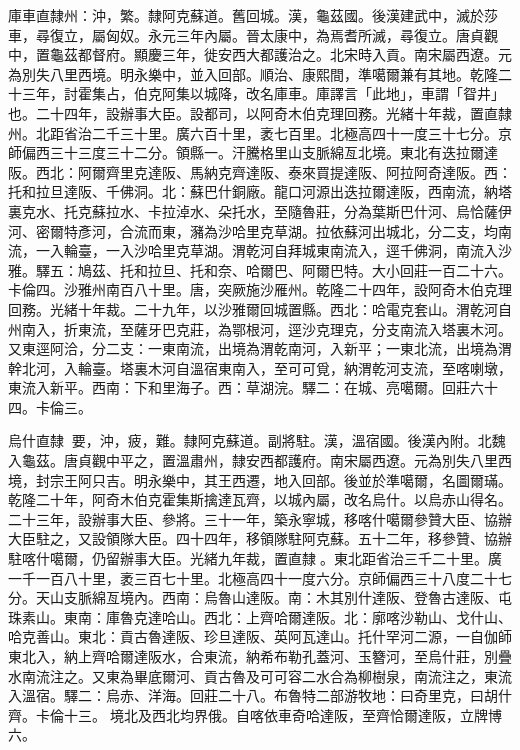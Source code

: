 \begin{pinyinscope}
庫車直隸州：沖，繁。隸阿克蘇道。舊回城。漢，龜茲國。後漢建武中，滅於莎車，尋復立，屬匈奴。永元三年內屬。晉太康中，為焉耆所滅，尋復立。唐貞觀中，置龜茲都督府。顯慶三年，徙安西大都護治之。北宋時入貢。南宋屬西遼。元為別失八里西境。明永樂中，並入回部。順治、康熙間，準噶爾兼有其地。乾隆二十三年，討霍集占，伯克阿集以城降，改名庫車。庫譯言「此地」，車謂「眢井」也。二十四年，設辦事大臣。設都司，以阿奇木伯克理回務。光緒十年裁，置直隸州。北距省治二千三十里。廣六百十里，袤七百里。北極高四十一度三十七分。京師偏西三十三度三十二分。領縣一。汗騰格里山支脈綿亙北境。東北有迭拉爾達阪。西北：阿爾齊里克達阪、馬納克齊達阪、泰來買提達阪、阿拉阿奇達阪。西：托和拉旦達阪、千佛洞。北：蘇巴什銅廠。龍口河源出迭拉爾達阪，西南流，納塔裏克水、托克蘇拉水、卡拉淖水、朵托水，至隨魯莊，分為葉斯巴什河、烏恰薩伊河、密爾特彥河，合流而東，瀦為沙哈里克草湖。拉依蘇河出城北，分二支，均南流，一入輪臺，一入沙哈里克草湖。渭乾河自拜城東南流入，逕千佛洞，南流入沙雅。驛五：鳩茲、托和拉旦、托和奈、哈爾巴、阿爾巴特。大小回莊一百二十六。卡倫四。沙雅州南百八十里。唐，突厥施沙雁州。乾隆二十四年，設阿奇木伯克理回務。光緒十年裁。二十九年，以沙雅爾回城置縣。西北：哈電克套山。渭乾河自州南入，折東流，至薩牙巴克莊，為鄂根河，逕沙克理克，分支南流入塔裏木河。又東逕阿洽，分二支：一東南流，出境為渭乾南河，入新平；一東北流，出境為渭幹北河，入輪臺。塔裏木河自溫宿東南入，至可可覓，納渭乾河支流，至喀喇墩，東流入新平。西南：下和里海子。西：草湖浣。驛二：在城、亮噶爾。回莊六十四。卡倫三。

烏什直隸：要，沖，疲，難。隸阿克蘇道。副將駐。漢，溫宿國。後漢內附。北魏入龜茲。唐貞觀中平之，置溫肅州，隸安西都護府。南宋屬西遼。元為別失八里西境，封宗王阿只吉。明永樂中，其王西遷，地入回部。後並於準噶爾，名圖爾璊。乾隆二十年，阿奇木伯克霍集斯擒達瓦齊，以城內屬，改名烏什。以烏赤山得名。二十三年，設辦事大臣、參將。三十一年，築永寧城，移喀什噶爾參贊大臣、協辦大臣駐之，又設領隊大臣。四十四年，移領隊駐阿克蘇。五十二年，移參贊、協辦駐喀什噶爾，仍留辦事大臣。光緒九年裁，置直隸。東北距省治三千二十里。廣一千一百八十里，袤三百七十里。北極高四十一度六分。京師偏西三十八度二十七分。天山支脈綿亙境內。西南：烏魯山達阪。南：木其別什達阪、登魯古達阪、屯珠素山。東南：庫魯克達哈山。西北：上齊哈爾達阪。北：廓喀沙勒山、戈什山、哈克善山。東北：貢古魯達阪、珍旦達阪、英阿瓦達山。托什罕河二源，一自伽師東北入，納上齊哈爾達阪水，合東流，納希布勒孔蓋河、玉簪河，至烏什莊，別疊水南流注之。又東為畢底爾河、貢古魯及可可容二水合為柳樹泉，南流注之，東流入溫宿。驛二：烏赤、洋海。回莊二十八。布魯特二部游牧地：曰奇里克，曰胡什齊。卡倫十三。境北及西北均界俄。自喀依車奇哈達阪，至齊恰爾達阪，立牌博六。


\end{pinyinscope}
